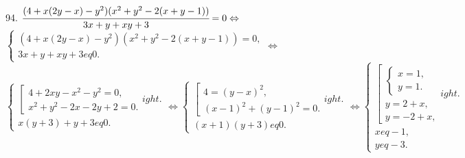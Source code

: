 94. $\cfrac{(4+x(2y-x)-y^2)(x^2+y^2-2(x+y-1))}{3x+y+xy+3}=0\Leftrightarrow$\\$
\begin{cases}

(4+x(2y-x)-y^2)(x^2+y^2-2(x+y-1))=0,\\
3x+y+xy+3
eq0.
\end{cases}\Leftrightarrow$\\$
\begin{cases}
\left[\begin{array}{l}
4+2xy-x^2-y^2=0,\\
x^2+y^2-2x-2y+2=0.
\end{array}
ight.\\
x(y+3)+y+3
eq0.
\end{cases}\Leftrightarrow
\begin{cases}
\left[\begin{array}{l}
4=(y-x)^2,\\
(x-1)^2+(y-1)^2=0.
\end{array}
ight.\\
(x+1)(y+3)
eq0.
\end{cases}\Leftrightarrow
\begin{cases}
\left[\begin{array}{l}
\begin{cases}
x=1,\\
y=1.
\end{cases}\\
y=2+x,\\
y=-2+x,
\end{array}
ight.\\
x
eq-1,\\
y
eq-3.
\end{cases}$
\begin{figure}[ht!]
\end{figure}\\
